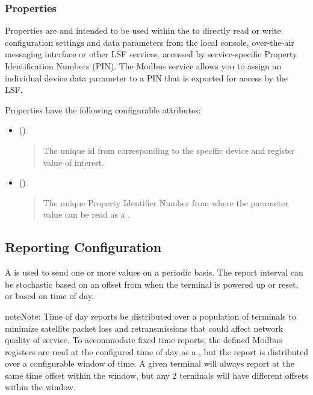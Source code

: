\documentclass[letterpaper,10pt,english]{sphinxmanual}
\begin{document}
\subsubsection{Properties}
\label{\detokenize{configuration:properties}}\label{\detokenize{configuration:id4}}
Properties are  and intended to be used within the  to directly read or write configuration settings and data parameters from the local console, over-the-air messaging interface or other LSF services, accessed by service-specific Property Identification Numbers (PIN).  The Modbus service allows you to assign an individual device data parameter to a PIN that is exported for access by the LSF.

Properties have the following configurable attributes:
\begin{itemize}
\item {} 
 ()
\begin{quote}

The unique {\hyperref[\detokenize{configuration:parameters}]{}} id from  corresponding to the specific device and register value of interest.
\end{quote}

\item {} 
 ()
\begin{quote}

The unique Property Identifier Number from  where the parameter value can be read as a .
\end{quote}

\end{itemize}


\subsection{Reporting Configuration}
\label{\detokenize{configuration:reporting-configuration}}
A  is used to send one or more  values on a periodic basis.
The report interval can be stochastic based on an offset from when the terminal is powered up or reset, or based on time of day.

\begin{sphinxadmonition}{note}{Note:}
Time of day reports  be distributed over a population of terminals to minimize satellite packet loss and retransmissions that could affect network quality of service.
To accommodate fixed time reports, the defined Modbus registers are read at the configured time of day as a , but the report is distributed over a configurable window of time.
A given terminal will always report at the same time offset within the window, but any 2 terminals will have different offsets within the window.
\end{sphinxadmonition}
\end{document}
